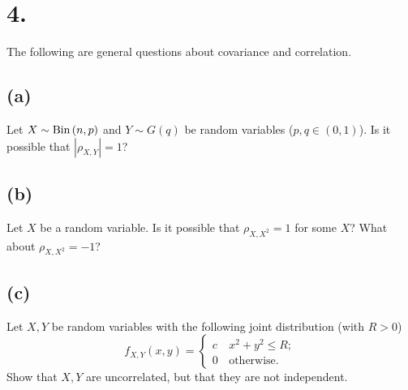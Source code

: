 \documentclass{article}
\begin{document}
\section*{4.}
{\Large 
The following are general questions about covariance and
correlation.

\subsection*{(a)}
Let $X\sim{\rm Bin}\left(n,p\right)$ and $Y\sim G\left(q\right)$
be random variables ($p,q\in\left(0,1\right)$). Is it possible that
$\left|\rho_{X,Y}\right|=1$?

\subsection*{(b)}
Let $X$ be a random variable. Is it possible that $\rho_{X,X^{2}}=1$
for some $X$? What about $\rho_{X,X^{2}}=-1$?

\subsection*{(c)}
Let $X,Y$ be random variables with the following joint
distribution (with $R>0$)
\[
f_{X,Y}\left(x,y\right)=\begin{cases}
c & \,x^{2}+y^{2}\le R;\\
0 & \,\mbox{otherwise}.
\end{cases}
\]
Show that $X,Y$ are uncorrelated, but that they are not independent.

}
\end{document}
